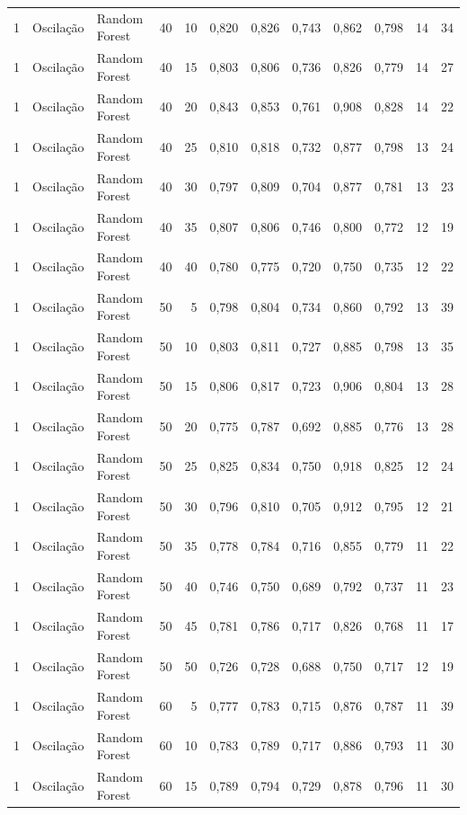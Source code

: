 \begin{longtable}{@{}rllrrrrrrrrr@{}}
1 & Oscilação & Random Forest & 40 & 10 & 0,820 & 0,826 & 0,743 & 0,862 & 0,798 & 14 & 34 \\
1 & Oscilação & Random Forest & 40 & 15 & 0,803 & 0,806 & 0,736 & 0,826 & 0,779 & 14 & 27 \\
1 & Oscilação & Random Forest & 40 & 20 & 0,843 & 0,853 & 0,761 & 0,908 & 0,828 & 14 & 22 \\
1 & Oscilação & Random Forest & 40 & 25 & 0,810 & 0,818 & 0,732 & 0,877 & 0,798 & 13 & 24 \\
1 & Oscilação & Random Forest & 40 & 30 & 0,797 & 0,809 & 0,704 & 0,877 & 0,781 & 13 & 23 \\
1 & Oscilação & Random Forest & 40 & 35 & 0,807 & 0,806 & 0,746 & 0,800 & 0,772 & 12 & 19 \\
1 & Oscilação & Random Forest & 40 & 40 & 0,780 & 0,775 & 0,720 & 0,750 & 0,735 & 12 & 22 \\
1 & Oscilação & Random Forest & 50 & 5 & 0,798 & 0,804 & 0,734 & 0,860 & 0,792 & 13 & 39 \\
1 & Oscilação & Random Forest & 50 & 10 & 0,803 & 0,811 & 0,727 & 0,885 & 0,798 & 13 & 35 \\
1 & Oscilação & Random Forest & 50 & 15 & 0,806 & 0,817 & 0,723 & 0,906 & 0,804 & 13 & 28 \\
1 & Oscilação & Random Forest & 50 & 20 & 0,775 & 0,787 & 0,692 & 0,885 & 0,776 & 13 & 28 \\
1 & Oscilação & Random Forest & 50 & 25 & 0,825 & 0,834 & 0,750 & 0,918 & 0,825 & 12 & 24 \\
1 & Oscilação & Random Forest & 50 & 30 & 0,796 & 0,810 & 0,705 & 0,912 & 0,795 & 12 & 21 \\
1 & Oscilação & Random Forest & 50 & 35 & 0,778 & 0,784 & 0,716 & 0,855 & 0,779 & 11 & 22 \\
1 & Oscilação & Random Forest & 50 & 40 & 0,746 & 0,750 & 0,689 & 0,792 & 0,737 & 11 & 23 \\
1 & Oscilação & Random Forest & 50 & 45 & 0,781 & 0,786 & 0,717 & 0,826 & 0,768 & 11 & 17 \\
1 & Oscilação & Random Forest & 50 & 50 & 0,726 & 0,728 & 0,688 & 0,750 & 0,717 & 12 & 19 \\
1 & Oscilação & Random Forest & 60 & 5 & 0,777 & 0,783 & 0,715 & 0,876 & 0,787 & 11 & 39 \\
1 & Oscilação & Random Forest & 60 & 10 & 0,783 & 0,789 & 0,717 & 0,886 & 0,793 & 11 & 30 \\
1 & Oscilação & Random Forest & 60 & 15 & 0,789 & 0,794 & 0,729 & 0,878 & 0,796 & 11 & 30 \\

\end{longtable}

